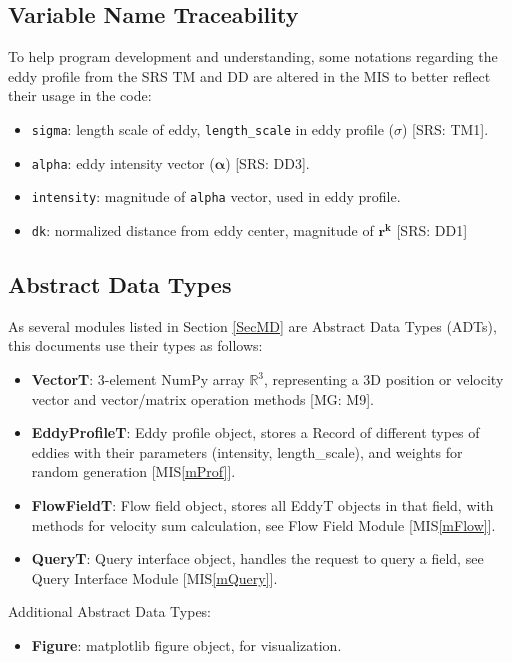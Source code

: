 \documentclass[12pt, titlepage]{article}
\begin{document}
\subsection{Variable Name Traceability}
To help program development and understanding, some notations regarding the eddy profile from the SRS TM and DD are altered in the MIS to better reflect their usage in the code:
\begin{itemize}
  \item \texttt{sigma}: length scale of eddy, \texttt{length\_scale} in eddy profile ($\sigma$) [SRS: TM1].
  \item \texttt{alpha}: eddy intensity vector ($\boldsymbol{\alpha}$) [SRS: DD3].
  \item \texttt{intensity}: magnitude of \texttt{alpha} vector, used in eddy profile.
  \item \texttt{dk}: normalized distance from eddy center, magnitude of $\mathbf{r^k}$ [SRS: DD1]
\end{itemize}

\subsection{Abstract Data Types}

As several modules listed in Section \ref{SecMD} are Abstract Data Types (ADTs), this documents use their types as follows:
\begin{itemize}
  \item \textbf{VectorT}: 3-element NumPy array $\mathbb{R}^3$, representing a 3D position or velocity vector and vector/matrix operation methods [MG: M9].
  \item \textbf{EddyProfileT}: Eddy profile object, stores a Record of different types of eddies with their parameters (intensity, length\_scale), and weights for random generation [MIS\ref{mProf}].
  \item \textbf{FlowFieldT}: Flow field object, stores all EddyT objects in that field, with methods for velocity sum calculation, see Flow Field Module [MIS\ref{mFlow}].
  \item \textbf{QueryT}: Query interface object, handles the request to query a field, see Query Interface Module [MIS\ref{mQuery}].
\end{itemize}

Additional Abstract Data Types:
\begin{itemize}
  \item \textbf{Figure}: matplotlib figure object, for visualization.
\end{itemize}
\end{document}
